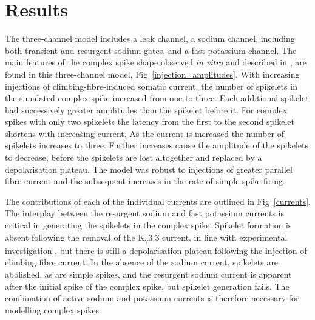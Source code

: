 \documentclass[utf8]{frontiersSCNS} %
\begin{document}
\section{Results}

The three-channel model includes a leak channel, a sodium channel,
including both transient and resurgent sodium gates, and a fast
potassium channel. The main features of the complex spike shape
observed \textsl{in vitro} and described in \cite{DavieEtAl2008}, are found
in this three-channel model, Fig~\ref{injection_amplitudes}. With increasing
injections of climbing-fibre-induced somatic current, the number of spikelets in the simulated
complex spike increased from one to three. Each additional spikelet
had successively greater amplitudes than the spikelet before it. For
complex spikes with only two spikelets the latency from the first to
the second spikelet shortens with increasing current. As the current
is increased the number of spikelets increases to three. Further
increases cause the amplitude of the spikelets to decrease, before the
spikelets are lost altogether and replaced by a depolarisation plateau. The model was robust to injections of greater parallel fibre current and the subsequent increases in the rate of simple spike firing.



The contributions of each of the individual currents are outlined in
Fig~\ref{currents}.  The interplay between the resurgent sodium and
fast potassium currents is critical in generating the spikelets in the
complex spike. Spikelet formation is absent following the removal of
the K\textsubscript{v}3.3 current, in line with experimental
investigation \cite{ZaghaEtAl2010}, but there is still a depolarisation plateau following
the injection of climbing fibre current. In the absence of the
sodium current, spikelets are abolished, as are simple
spikes, and the resurgent sodium current is apparent after the initial
spike of the complex spike, but spikelet generation fails. The combination of active sodium and potassium currents is
therefore necessary for modelling complex spikes.
\end{document}
